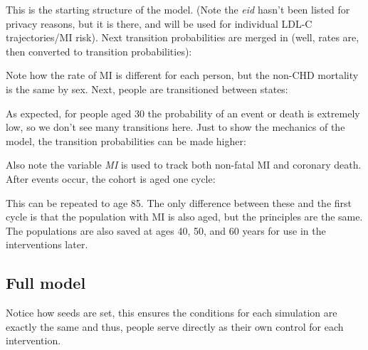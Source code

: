 \documentclass[11pt]{article}
\begin{document}
This is the starting structure of the model. (Note 
the \emph{eid} hasn't been listed for privacy reasons, but it is there,
and will be used for individual LDL-C trajectories/MI risk). Next
transition probabilities are merged in (well, rates are, then converted to 
transition probabilities):

\color{Blue4}
\begin{stlog}\end{stlog}
\begin{stlog}\end{stlog}
\color{black}

Note how the rate of MI is different for each person, 
but the non-CHD mortality is the same by sex.
Next, people are transitioned between states:

\color{Blue4}
\begin{stlog}\end{stlog}
\color{black}

As expected, for people aged 30 the probability of 
an event or death is extremely low, so we don't see 
many transitions here. Just to show the mechanics of the model, the 
transition probabilities can be made higher:

\color{Blue4}
\begin{stlog}\end{stlog}
\color{black}

Also note the variable \emph{MI} is used to track
both non-fatal MI and coronary death. 
After events occur, the cohort is aged one cycle:

\color{Blue4}
\begin{stlog}\end{stlog}
\begin{stlog}\end{stlog}
\color{black}

This can be repeated to age 85.
The only difference between these and the first cycle 
is that the population with MI is also aged,
but the principles are the same.
The populations are also saved at ages 40, 50, and 60 years
for use in the interventions later. 

\subsection{Full model}

Notice how seeds are set, this ensures the conditions for each simulation are 
exactly the same and thus, people serve directly as their own control for each intervention. 
\end{document}
